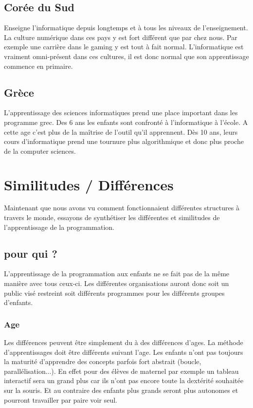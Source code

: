 \subsection{Corée du Sud}
Enseigne l'informatique depuis longtemps et à tous les niveaux de l'enseignement. La culture numérique dans ces pays y est fort différent que par chez nous. Par exemple une carrière dans le gaming y est tout à fait normal. L'informatique est vraiment omni-présent dans ces cultures, il est donc normal que son apprentissage commence en primaire.

\subsection{Grèce}
L'apprentissage des sciences informatiques prend une place important dans les programme grec. Des 6 ans les enfants sont confronté à l'informatique à l'école. A cette age c'est plus de la maîtrise de l'outil qu'il apprennent. Dès 10 ans, leurs cours d'informatique prend une tournure plus algorithmique et donc plus proche de la computer sciences.

\section{Similitudes / Différences}
Maintenant que nous avons vu comment fonctionnaient différentes structures à travers le monde, essayons de synthétiser les différentes et similitudes de l'apprentissage de la programmation.
\subsection{pour qui ?}
L'apprentissage de la programmation aux enfants ne se fait pas de la même manière avec tous ceux-ci. Les différentes organisations auront donc soit un public visé restreint soit différents programmes pour les différents groupes d'enfants. 

\subsubsection{Age}
Les différences peuvent être simplement du à des différences d'ages. La méthode d'apprentissages doit être différents suivant l'age. Les enfants n'ont pas toujours la maturité d'apprendre des concepts parfois fort abstrait (boucle, parallélisation...). En effet pour des élèves de maternel par exemple un tableau interactif sera un grand plus car ils n'ont pas encore toute la dextérité souhaitée sur la souris. Et au contraire des enfants plus grands seront plus autonomes et pourront travailler par paire voir seul.

